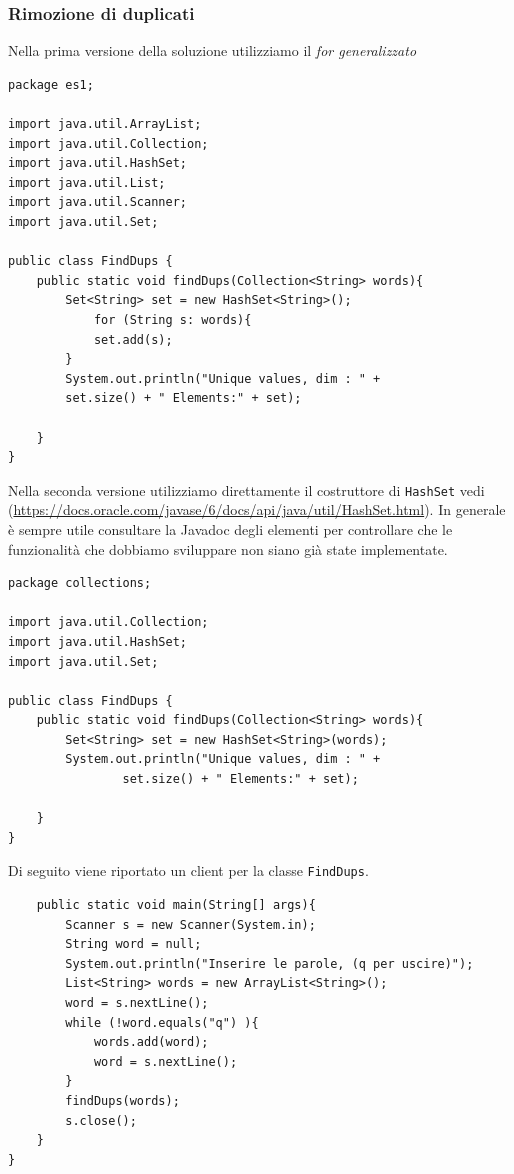 \documentclass{article}
\begin{document}
\subsubsection{Rimozione di duplicati}

Nella prima versione della soluzione utilizziamo il \emph{for generalizzato}
\begin{lstlisting}
package es1;

import java.util.ArrayList;
import java.util.Collection;
import java.util.HashSet;
import java.util.List;
import java.util.Scanner;
import java.util.Set;

public class FindDups {
	public static void findDups(Collection<String> words){
	    Set<String> set = new HashSet<String>();
	        for (String s: words){
			set.add(s);
		}
		System.out.println("Unique values, dim : " + 
		set.size() + " Elements:" + set);
			
	}
}
\end{lstlisting}

Nella seconda versione utilizziamo direttamente il costruttore di \texttt{HashSet} vedi (\url{https://docs.oracle.com/javase/6/docs/api/java/util/HashSet.html}). In generale \`e sempre utile consultare la Javadoc degli elementi per controllare che le funzionalit\`a che dobbiamo sviluppare non siano gi\`a state implementate.
\begin{lstlisting}
package collections;

import java.util.Collection;
import java.util.HashSet;
import java.util.Set;

public class FindDups {
	public static void findDups(Collection<String> words){
		Set<String> set = new HashSet<String>(words);
		System.out.println("Unique values, dim : " + 
				set.size() + " Elements:" + set);
		
	}
}
\end{lstlisting}
Di seguito viene riportato un client per la classe \texttt{FindDups}.
\begin{lstlisting}
	public static void main(String[] args){
		Scanner s = new Scanner(System.in);
		String word = null;
		System.out.println("Inserire le parole, (q per uscire)");
		List<String> words = new ArrayList<String>();
		word = s.nextLine();		
		while (!word.equals("q") ){
			words.add(word);
			word = s.nextLine();
		} 
		findDups(words);
		s.close();
	}
}
\end{lstlisting}
\end{document}
